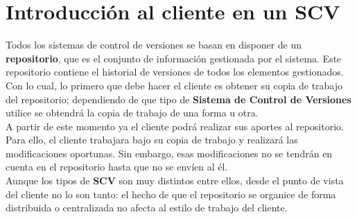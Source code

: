 

\section{Introducción al cliente en un \textbf{SCV}}

Todos los sistemas de control de versiones se basan en disponer de un  
\textbf{repositorio}, que es el conjunto de información gestionada por
el sistema. Este repositorio contiene el historial de versiones de
todos los elementos gestionados. Con lo cual, lo primero que debe
hacer el cliente es obtener su copia de trabajo del repositorio;
dependiendo de que tipo de \textbf{Sistema de Control de Versiones}
utilice se obtendrá la copia de trabajo de una forma u otra.\\

A partir de este momento ya el cliente podrá realizar sus aportes al
repositorio. Para ello, el cliente trabajara bajo su copia de trabajo
y realizará las modificaciones oportunas. Sin embargo, esas
modificaciones no se tendrán en cuenta en el repositorio hasta que no
se envíen al él. \\

Aunque los tipos de \textbf{SCV} son muy distintos entre ellos, desde
el punto de vista del cliente no lo son tanto: el hecho de que el
repositorio se organice de forma distribuida o centralizada no afecta
al estilo de trabajo del cliente. \\

